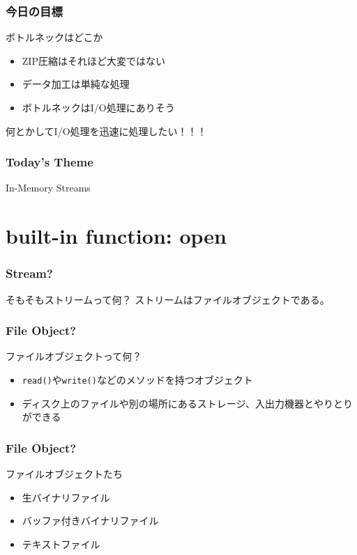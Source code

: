 \documentclass[aspectratio=169,dvipdfmx,14pt,notheorems]{beamer}
\theoremstyle{definition}
\begin{document}
\begin{frame}\frametitle{今日の目標}

\begin{block}{ボトルネックはどこか}
\begin{itemize}
\item ZIP圧縮はそれほど大変ではない
\item データ加工は単純な処理
\item ボトルネックはI/O処理にありそう
\end{itemize}
\end{block}
何とかしてI/O処理を迅速に処理したい！！！
\end{frame}

\begin{frame}\frametitle{Today's Theme}
\begin{center}
\huge{In-Memory Streams}
\end{center}
\end{frame}

\section{built-in function: open}

\begin{frame}\frametitle{Stream?}

\begin{block}{そもそもストリームって何？}
ストリームはファイルオブジェクトである。
\end{block}

\end{frame}

\begin{frame}\frametitle{File Object?}

\begin{block}{ファイルオブジェクトって何？}
\begin{itemize}
\item \texttt{read()}や\texttt{write()}などのメソッドを持つオブジェクト
\item ディスク上のファイルや別の場所にあるストレージ、入出力機器とやりとりができる
\end{itemize}
\end{block}

\end{frame}

\begin{frame}\frametitle{File Object?}

\begin{block}{ファイルオブジェクトたち}
\begin{itemize}
\item 生バイナリファイル
\item バッファ付きバイナリファイル
\item テキストファイル
\end{itemize}
\end{block}

\end{frame}
\end{document}
